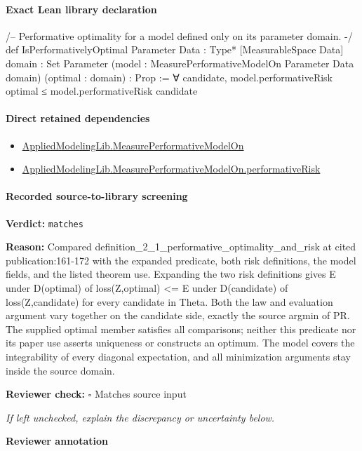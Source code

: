\documentclass[10pt]{article}
\newcommand{\reviewerbox}{%
  \par\noindent\fbox{\parbox{0.96\linewidth}{\rule{0pt}{0.38in}}}\par
}
\newcommand{\reviewmatch}[1]{%
  \par\noindent\textbf{Reviewer check:} $\square$\; #1\par
  \noindent\emph{If left unchecked, explain the discrepancy or uncertainty below.}\par
}
\begin{document}
\paragraph{Exact Lean library declaration}
\begin{ReviewVerbatim}
/-- Performative optimality for a model defined only on its parameter domain. -/
def IsPerformativelyOptimal
    {Parameter Data : Type*} [MeasurableSpace Data] {domain : Set Parameter}
    (model : MeasurePerformativeModelOn Parameter Data domain)
    (optimal : domain) : Prop :=
  ∀ candidate, model.performativeRisk optimal ≤ model.performativeRisk candidate
\end{ReviewVerbatim}

\paragraph{Direct retained dependencies}
\begin{itemize}\raggedright
\item \hyperlink{library-prerequisite-e14cc5e8b1e1460e}{Applied\allowbreak{}Modeling\allowbreak{}Lib.\allowbreak{}Measure\allowbreak{}Performative\allowbreak{}Model\allowbreak{}On}
\item \hyperlink{library-prerequisite-8eef8d8ba05e7ebe}{Applied\allowbreak{}Modeling\allowbreak{}Lib.\allowbreak{}Measure\allowbreak{}Performative\allowbreak{}Model\allowbreak{}On.\allowbreak{}performative\allowbreak{}Risk}
\end{itemize}
\paragraph{Recorded source-to-library screening}
\textbf{Verdict:} \texttt{matches}
\\
{\raggedright
\textbf{Reason:} Compared definition\_\allowbreak{}2\_\allowbreak{}1\_\allowbreak{}performative\_\allowbreak{}optimality\_\allowbreak{}and\_\allowbreak{}risk at cited publication:\allowbreak{}161-\allowbreak{}172 with the expanded predicate, both risk definitions, the model fields, and the listed theorem use.\allowbreak{} Expanding the two risk definitions gives E under D(optimal) of loss(Z,optimal) <= E under D(candidate) of loss(Z,candidate) for every candidate in Theta.\allowbreak{} Both the law and evaluation argument vary together on the candidate side, exactly the source argmin of PR.\allowbreak{} The supplied optimal member satisfies all comparisons;\allowbreak{} neither this predicate nor its paper use asserts uniqueness or constructs an optimum.\allowbreak{} The model covers the integrability of every diagonal expectation, and all minimization arguments stay inside the source domain.\allowbreak{}
\par}
\reviewmatch{Matches source input}
\noindent\textbf{Reviewer annotation}\par
\reviewerbox
\clearpage
\hypertarget{library-prerequisite-4af6c70f954a80a0}{}
\end{document}
